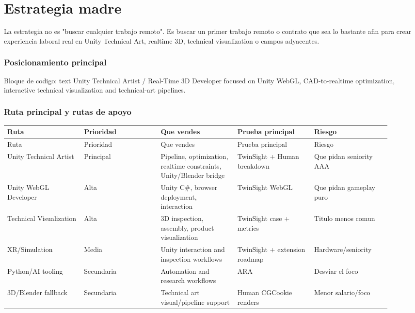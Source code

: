 \chapter{Estrategia madre}


La estrategia no es "buscar cualquier trabajo remoto". Es buscar un primer trabajo remoto o contrato que sea lo bastante afin para crear experiencia laboral real en Unity Technical Art, realtime 3D, technical visualization o campos adyacentes.


\subsection{Posicionamiento principal}


\begin{mdcode}
Bloque de codigo: text
Unity Technical Artist / Real-Time 3D Developer focused on Unity WebGL, CAD-to-realtime optimization, interactive technical visualization and technical-art pipelines.
\end{mdcode}


\subsection{Ruta principal y rutas de apoyo}


\begin{center}
\scriptsize
\begin{longtable}{>{\raggedright\arraybackslash}p{0.184\linewidth} >{\raggedright\arraybackslash}p{0.184\linewidth} >{\raggedright\arraybackslash}p{0.184\linewidth} >{\raggedright\arraybackslash}p{0.184\linewidth} >{\raggedright\arraybackslash}p{0.184\linewidth}}
\toprule
Ruta & Prioridad & Que vendes & Prueba principal & Riesgo \\
\midrule
\endfirsthead
\toprule
Ruta & Prioridad & Que vendes & Prueba principal & Riesgo \\
\midrule
\endhead
Unity Technical Artist & Principal & Pipeline, optimization, realtime constraints, Unity/Blender bridge & TwinSight + Human breakdown & Que pidan seniority AAA \\
Unity WebGL Developer & Alta & Unity C\#, browser deployment, interaction & TwinSight WebGL & Que pidan gameplay puro \\
Technical Visualization & Alta & 3D inspection, assembly, product visualization & TwinSight case + metrics & Titulo menos comun \\
XR/Simulation & Media & Unity interaction and inspection workflows & TwinSight + extension roadmap & Hardware/seniority \\
Python/AI tooling & Secundaria & Automation and research workflows & ARA & Desviar el foco \\
3D/Blender fallback & Secundaria & Technical art visual/pipeline support & Human CGCookie renders & Menor salario/foco \\
\bottomrule
\end{longtable}
\end{center}



